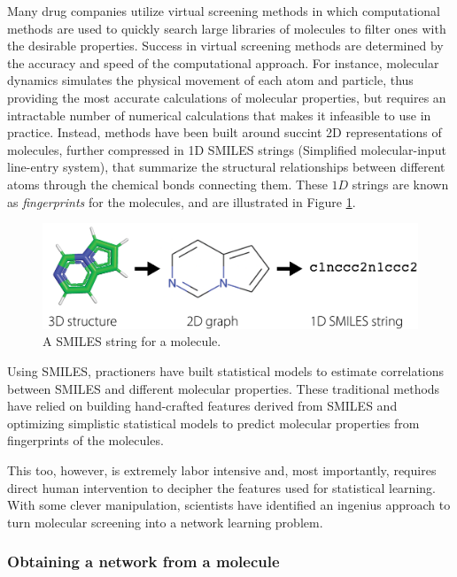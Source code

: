 Many drug companies utilize virtual screening methods in which computational methods are used to quickly search large libraries of molecules to filter ones with the desirable properties. Success in virtual screening methods are determined by the accuracy and speed of the computational approach. For instance, molecular dynamics simulates the physical movement of each atom and particle, thus providing the most accurate calculations of molecular properties, but requires an intractable number of numerical calculations that makes it infeasible to use in practice. Instead, methods have been built around succint 2D representations of molecules, further compressed in 1D SMILES  \cite{Weininger1988Feb,Weininger1989May,Weininger1990Aug} strings (Simplified molecular-input line-entry system), that summarize the structural relationships between different atoms through the chemical bonds connecting them. These $1D$ strings are known as \textit{fingerprints} for the molecules, and are illustrated in Figure \ref{fig:next:gnn:smiles}.

\begin{figure}
    \centering
    \includegraphics[width=\linewidth]{next/Images/molecule_repr.png}
    \caption[SMILES string for a molecule]{A SMILES string for a molecule.}
    \label{fig:next:gnn:smiles}
\end{figure}

Using SMILES, practioners have built statistical models to estimate correlations between SMILES and different molecular properties. These traditional methods have relied on building hand-crafted features derived from SMILES and optimizing simplistic statistical models to predict molecular properties from fingerprints of the molecules. 

This too, however, is extremely labor intensive and, most importantly, requires direct human intervention to decipher the features used for statistical learning. With some clever manipulation, scientists have identified an ingenius approach to turn molecular screening into a network learning problem.
\subsubsection*{Obtaining a network from a molecule}

